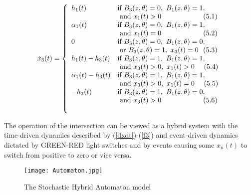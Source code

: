 \documentclass{ifacconf}\usepackage{graphicx}
\begin{document}
\begin{equation}
\dot{x}_{3}(t)=\left\{
\begin{array}
[c]{ll}h_{1}(t) & \text{if }B_{3}(z,\theta)=0,\text{ }B_{1}(z,\theta)=1,\\
& \text{ and }x_{1}(t)>0\text{ \ \ \ \ \ \ \ \ \ \ \ \ \ \ \ \ \ }(5.1)\\
\alpha_{1}(t) & \text{if }B_{3}(z,\theta)=0,\text{ }B_{1}(z,\theta)=1,\\
& \text{ and }x_{1}(t)=0\text{ \ \ \ \ \ \ \ \ \ \ \ \ \ \ \ \ \ }(5.2)\\
0 & \text{if }B_{3}(z,\theta)=0,\text{ }B_{1}(z,\theta)=0,\\
& \text{ or }B_{3}(z,\theta)=1,\text{ }x_{3}(t)=0\text{ \ }(5.3)\\
h_{1}(t)-h_{3}(t) & \text{if }B_{3}(z,\theta)=1,\text{ }B_{1}(z,\theta)=1,\\
& \text{ and }x_{3}(t)>0,\text{ }x_{1}(t)>0\text{ \ \ \ }(5.4)\\
\alpha_{1}(t)-h_{3}(t) & \text{if }B_{3}(z,\theta)=1,\text{ }B_{1}(z,\theta)=1,\\
& \text{ and }x_{3}(t)>0,\text{ }x_{1}(t)=0\text{ \ \ \ }(5.5)\\
-h_{3}(t) & \text{if }B_{3}(z,\theta)=1,\text{ }B_{1}(z,\theta)=0,\\
& \text{ and }x_{3}(t)>0\text{ \ \ \ \ \ \ \ \ \ \ \ \ \ \ \ \ \ }(5.6)\\
&
\end{array}
\right.  \label{f3}\end{equation}


The operation of the intersection can be viewed as a hybrid system with the
time-driven dynamics described by (\ref{dxdt})-(\ref{f3}) and event-driven
dynamics dictated by GREEN-RED light switches and by events causing some
$x_{n}(t)$ to switch from positive to zero or vice versa.

\begin{figure}[tbh]
\centering
\texttt{[image: Automaton.jpg]} \caption{The Stochastic Hybrid
Automaton model}\label{Automaton}\end{figure}
\end{document}
